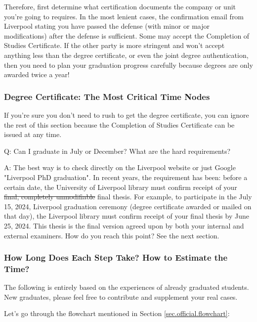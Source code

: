 Therefore, first determine what certification documents the company or unit you're going to requires. In the most lenient cases, the confirmation email from Liverpool stating you have passed the defense (with minor or major modifications) after the defense is sufficient. Some may accept the Completion of Studies Certificate. If the other party is more stringent and won't accept anything less than the degree certificate, or even the joint degree authentication, then you need to plan your graduation progress carefully because degrees are only awarded twice a year!

\subsubsection{Degree Certificate: The Most Critical Time Nodes}

If you're sure you don't need to rush to get the degree certificate, you can ignore the rest of this section because the Completion of Studies Certificate can be issued at any time.

Q: Can I graduate in July or December? What are the hard requirements?

A: The best way is to check directly on the Liverpool website or just Google "Liverpool PhD graduation". In recent years, the requirement has been: before a certain date, the University of Liverpool library must confirm receipt of your \sout{final, completely unmodifiable} final thesis. For example, to participate in the July 15, 2024, Liverpool graduation ceremony (degree certificate awarded or mailed on that day), the Liverpool library must confirm receipt of your final thesis by June 25, 2024. This thesis is the final version agreed upon by both your internal and external examiners. How do you reach this point? See the next section.

\subsubsection{How Long Does Each Step Take? How to Estimate the Time?}
\label{sec.graduation.time}

The following is entirely based on the experiences of already graduated students. New graduates, please feel free to contribute and supplement your real cases.

Let's go through the flowchart mentioned in Section \ref{sec.official.flowchart}:


